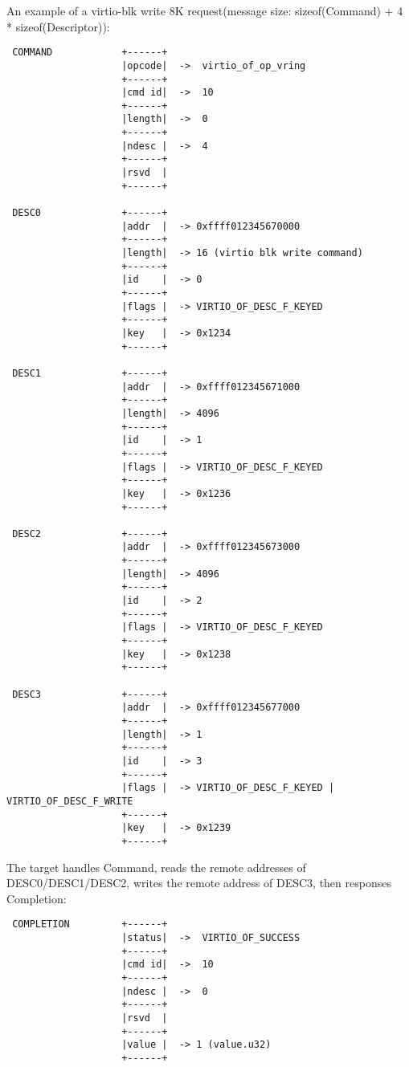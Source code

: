 An example of a virtio-blk write 8K request(message size: sizeof(Command) +
4 * sizeof(Descriptor)):
\begin{lstlisting}
 COMMAND            +------+
                    |opcode|  ->  virtio_of_op_vring
                    +------+
                    |cmd id|  ->  10
                    +------+
                    |length|  ->  0
                    +------+
                    |ndesc |  ->  4
                    +------+
                    |rsvd  |
                    +------+

 DESC0              +------+
                    |addr  |  -> 0xffff012345670000
                    +------+
                    |length|  -> 16 (virtio blk write command)
                    +------+
                    |id    |  -> 0
                    +------+
                    |flags |  -> VIRTIO_OF_DESC_F_KEYED
                    +------+
                    |key   |  -> 0x1234
                    +------+

 DESC1              +------+
                    |addr  |  -> 0xffff012345671000
                    +------+
                    |length|  -> 4096
                    +------+
                    |id    |  -> 1
                    +------+
                    |flags |  -> VIRTIO_OF_DESC_F_KEYED
                    +------+
                    |key   |  -> 0x1236
                    +------+

 DESC2              +------+
                    |addr  |  -> 0xffff012345673000
                    +------+
                    |length|  -> 4096
                    +------+
                    |id    |  -> 2
                    +------+
                    |flags |  -> VIRTIO_OF_DESC_F_KEYED
                    +------+
                    |key   |  -> 0x1238
                    +------+

 DESC3              +------+
                    |addr  |  -> 0xffff012345677000
                    +------+
                    |length|  -> 1
                    +------+
                    |id    |  -> 3
                    +------+
                    |flags |  -> VIRTIO_OF_DESC_F_KEYED | VIRTIO_OF_DESC_F_WRITE
                    +------+
                    |key   |  -> 0x1239
                    +------+
\end{lstlisting}

The target handles Command, reads the remote addresses of DESC0/DESC1/DESC2,
writes the remote address of DESC3, then responses Completion:
\begin{lstlisting}
 COMPLETION         +------+
                    |status|  ->  VIRTIO_OF_SUCCESS
                    +------+
                    |cmd id|  ->  10
                    +------+
                    |ndesc |  ->  0
                    +------+
                    |rsvd  |
                    +------+
                    |value |  -> 1 (value.u32)
                    +------+
\end{lstlisting}

